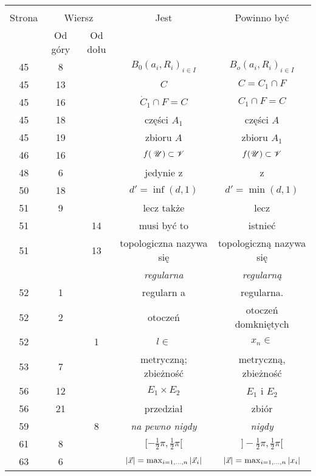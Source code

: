 \documentclass[a4paper,11pt]{article}
\begin{document}
\begin{center}

  \begin{tabular}{|c|c|c|c|c|}
    \hline
    & \multicolumn{2}{c|}{} & & \\
    Strona & \multicolumn{2}{c|}{Wiersz} & Jest
                              & Powinno być \\ \cline{2-3}
    & Od góry & Od dołu & & \\
    \hline
    45  &  8 & & $B_{ 0 }( a_{ i }, R_{ i } )_{ i \in I }$
           & $B_{ o }( a_{ i }, R_{ i } )_{ i \in I }$ \\
    45  & 13 & & $C$ & $C = C_{ 1 } \cap F$ \\
    45  & 16 & & $\dot{ C }_{ 1 } \cap F = C$ & $C_{ 1 } \cap F = C$ \\
    45  & 18 & & części $A_{ 1 }$ & części $A$ \\
    45  & 19 & & zbioru $A$ & zbioru $A_{ 1 }$ \\
    46  & 16 & & $f( \: \mathcal{U} ) \subset \mathcal{V}$ & $f( \mathcal{U} ) \subset \mathcal{V}$ \\
    48  &  6 & & jedynie z & z \\
    50  & 18 & & $d' = \inf( d, 1 )$ & $d' = \min( d, 1 )$ \\
    51  &  9 & & lecz także & lecz \\
    51  & & 14 & musi być to & istnieć \\
    51  & & 13 & topologiczna nazywa się & topologiczną nazywa się \\
    & & & \emph{regularna} & \emph{regularną} \\  %
    52  &  1 & & regularn a & regularna. \\
    52  &  2 & & otoczeń & otoczeń domkniętych \\
    52  & &  1 & $l \in$ & $x_{ n } \in$ \\
    53  &  7 & & metryczną; zbieżność & metryczną, zbieżność \\
    56  & 12 & & $E_{ 1 } \times E_{ 2 }$ & $E_{ 1 }$ i $E_{ 2 }$ \\
    56  & 21 & & przedział & zbiór \\
    59  & &  8 & \emph{na pewno nigdy} & \emph{nigdy} \\
    61  &  8 & & $[ -\frac{ 1 }{ 2 } \pi, \frac{ 1 }{ 2 } \pi [$
           & $] -\frac{ 1 }{ 2 } \pi, \frac{ 1 }{ 2 } \pi [$ \\
    63  &  6 & & $| \vec{ x } | = \max_{ i = 1, \ldots, n} | \vec{ x }_{ i } |$
           & $| \vec{ x } | = \max_{ i = 1, \ldots, n} | x_{ i } |$ \\

\end{tabular}
\end{center}
\end{document}
